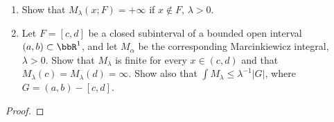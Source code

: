 \begin{problem}
\begin{enumerate}[label=(\alph*)]
\item Show that $M_\lambda(x;F)=+\infty$ if $x\notin F$, $\lambda>0$.
\item Let $F=[c,d]$ be a closed subinterval of a bounded open interval
  $(a,b)\subset\bbR^1$, and let $M_\alpha$ be the corresponding
  Marcinkiewicz integral, $\lambda>0$. Show that $M_\lambda$ is finite for
  every $x\in(c,d)$ and that $M_\lambda(c)=M_\lambda(d)=\infty$. Show also
  that $\int M_\lambda\leq\lambda^{-1}|G|$, where $G=(a,b)-[c,d]$.
\end{enumerate}
\end{problem}
\begin{proof}
\end{proof}

